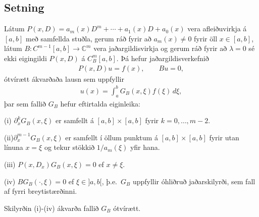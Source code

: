 \documentclass[a4paper,10pt,icelandic]{sphinxmanual}
\begin{document}
\subsection{Setning}
\label{\detokenize{Kafli03:id9}}
Látum \(P(x,D)=a_m(x)D^m+\cdots+a_1(x)D+a_0(x)\) vera afleiðuvirkja
á \([a,b]\) með samfellda stuðla, gerum ráð fyrir að
\(a_m(x)\neq 0\) fyrir öll \(x\in [a,b]\), látum
\(B:C^{m-1}[a,b]\to {{\mathbb  C}}^m\) vera jaðargildisvirkja og
gerum ráð fyrir að \({\lambda}=0\) sé ekki eigingildi \(P(x,D)\)
á \(C^m_B[a,b]\). Þá hefur jaðargildisverkefnið
\begin{equation*}
\begin{split}P(x,D)u=f(x), \qquad Bu=0,\end{split}
\end{equation*}
ótvírætt ákvarðaða lausn sem uppfyllir
\begin{equation*}
\begin{split}u(x) = \int_a^b G_B(x,{\xi})f({\xi})\, d{\xi},\end{split}
\end{equation*}
þar sem fallið \(G_B\) hefur eftirtalda eiginleika:

(i) \({\partial}_x^{k}G_B(x,{\xi})\) er samfellt á
\([a,b]\times [a,b]\) fyrir \(k=0,\dots,m-2\).

(ii)\({\partial}_x^{m-1}G_B(x,{\xi})\) er samfellt í öllum punktum
á \([a,b]\times [a,b]\) fyrir utan línuna \(x={\xi}\) og tekur
stökkið \(1/a_m({\xi})\) yfir hana.

(iii) \(P(x,D_x)G_B(x,{\xi})=0\) ef \(x\neq {\xi}\).

(iv) \(BG_B(\cdot,{\xi})=0\) ef \({\xi}\in ]a,b[\),
þ.e. \(G_B\) uppfyllir óhliðruð jaðarskilyrði, sem fall af fyrri
breytistærðinni.

Skilyrðin (i)-(iv) ákvarða fallið \(G_B\) ótvírætt.
\end{document}
